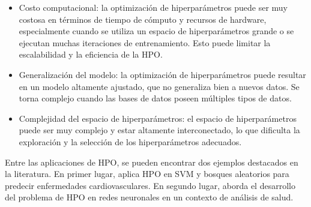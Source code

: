 \begin{itemize}
	\item Costo computacional: la optimización de hiperparámetros puede ser muy costosa en términos de tiempo de cómputo y recursos de hardware, especialmente cuando se utiliza un espacio de hiperparámetros grande o se ejecutan muchas iteraciones de entrenamiento. Esto puede limitar la escalabilidad y la eficiencia de la HPO.
	\item Generalización del modelo: la optimización de hiperparámetros puede resultar en un modelo altamente ajustado, que no generaliza bien a nuevos datos. Se torna complejo cuando las bases de datos poseen múltiples tipos de datos.
	\item Complejidad del espacio de hiperparámetros: el espacio de hiperparámetros puede ser muy complejo y estar altamente interconectado, lo que dificulta la exploración y la selección de los hiperparámetros adecuados.
\end{itemize}

Entre las aplicaciones de HPO, se pueden encontrar dos ejemplos destacados en la literatura. En primer lugar, \citep{hernandeztecnicas} aplica HPO en SVM y bosques aleatorios para predecir enfermedades cardiovasculares. En segundo lugar, \citep{waring2020automated} aborda el desarrollo del problema de HPO en redes neuronales en un contexto de análisis de salud.

